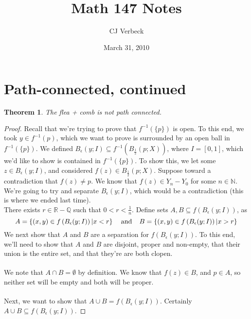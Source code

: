 \documentclass{article}
\newcommand{\R}{\mathbb{R}}
\newcommand{\Q}{\mathbb{Q}}
\newcommand{\N}{\mathbb{N}}
\newtheorem{Theorem}{Theorem}
\theoremstyle{definition}
\begin{document}
\title{Math 147  Notes}  %
\author{CJ Verbeck}      %
\date{March 31, 2010}
\maketitle


\section{Path-connected, continued}
\begin{Theorem}
The flea + comb is not path connected.
\end{Theorem}
\begin{proof}
Recall that we're trying to prove that $f^{-1}(\{p\})$ is open. To this end, we took $y\in f^{-1}(p)$, which we want to prove is surrounded by an open ball in $f^{-1} (\{p\})$. We defined $B_{\epsilon}(y;I)\subseteq f^{-1} \left( B_{\frac{1}{2}} (p;X)\right)$, where $I = [0,1]$, which we'd like to show is contained in $f^{-1}\left(\{p\}\right)$. To show this, we let some $z\in B_{\epsilon}(y;I)$, and considered $f(z) \in B_{\frac{1}{2}} (p;X)$. Suppose toward a contradiction that $f(z) \neq p$.  We know that $f(z) \in Y_n - Y_0$  for some $n\in \N$. We're going to try and separate $B_{\epsilon}(y;I)$, which would be a contradiction (this is where we ended last time).\vspace{.3in}\\  
There exists $r\in \R-\Q$ such that $0 < r < \frac{1}{n}$. Define sets $A, B\subseteq f\left( B_{\epsilon} (y;I) \right)$, as  
$$A = \left\{ (x,y)\in f\left( B_{\epsilon} (y;I) \right) | x< r\right\} \hspace{.15in} \text{and} \hspace{.15in} B =  \left\{ (x,y)\in f\left( B_{\epsilon} (y;I) \right) | x> r\right\}$$
We next show that $A$ and $B$ are a separation for $f\left( B_{\epsilon} (y;I) \right)$. To this end, we'll need to show that $A$ and $B$ are disjoint, proper and non-empty, that their union is the entire set, and that they're are both clopen.\\ \\
 We note that $A\cap B = \emptyset$ by definition. We know that $f(z)\in B$, and $p\in A$, so neither set will be empty and both will be proper.\\ \\
Next, we want to show that $A\cup B = f\left( B_\epsilon (y;I) \right)$. Certainly $A\cup B \subseteq f\left( B_{\epsilon} (y;I) \right)$. 

\end{proof}
\end{document}
